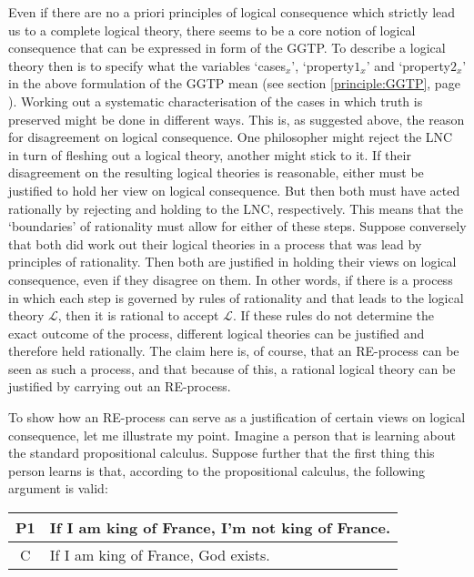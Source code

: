 \documentclass{article}
\begin{document}
Even if there are no a priori principles of logical consequence which strictly lead us to a complete logical theory, there seems to be a core notion of logical consequence that can be expressed in form of the GGTP. To describe a logical theory then is to specify what the variables `cases$_x$', `property$1_x$' and `property$2_x$' in the above formulation of the GGTP mean (see section \ref{principle:GGTP}, page \pageref{principle:GGTP}). Working out a systematic characterisation of the cases in which truth is preserved might be done in different ways. This is, as suggested above, the reason for disagreement on logical consequence. One philosopher might reject the LNC in turn of fleshing out a logical theory, another might stick to it. If their disagreement on the resulting logical theories is reasonable, either must be justified to hold her view on logical consequence. But then both must have acted rationally by rejecting and holding to the LNC, respectively. This means that the `boundaries' of rationality must allow for either of these steps. Suppose conversely that both did work out their logical theories in a process that was lead by principles of rationality. Then both are justified in holding their views on logical consequence, even if they disagree on them. In other words, if there is a process in which each step is governed by rules of rationality and that leads to the logical theory $\mathcal{L}$, then it is rational to accept $\mathcal{L}$. If these rules do not determine the exact outcome of the process, different logical theories can be justified and therefore held rationally. The claim here is, of course, that an RE-process can be seen as such a process, and that because of this, a rational logical theory can be justified by carrying out an RE-process.

To show how an RE-process can serve as a justification of certain views on logical consequence, let me illustrate my point. Imagine a person that is learning about the standard propositional calculus. Suppose further that the first thing this person learns is that, according to the propositional calculus, the following argument is valid:

\begin{center}
\begin{tabular}{c p{9cm}}
P1 & If I am king of France, I'm not king of France.\\\hline
C & If I am king of France, God exists. 
\end{tabular}
\end{center}
\end{document}
